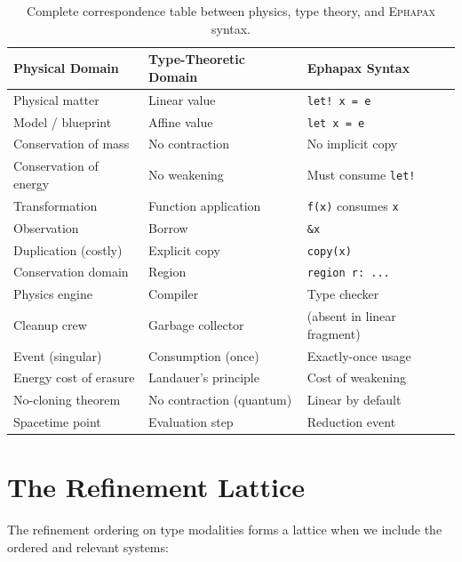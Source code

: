 \documentclass[11pt,a4paper]{article}
\newcommand{\ephapax}{\textsc{Ephapax}}
\begin{document}
\begin{table}[ht]
\centering
\small
\begin{tabular}{@{}lll@{}}
\toprule
\textbf{Physical Domain} & \textbf{Type-Theoretic Domain} & \textbf{Ephapax Syntax} \\
\midrule
Physical matter & Linear value & \texttt{let! x = e} \\
Model / blueprint & Affine value & \texttt{let x = e} \\
Conservation of mass & No contraction & No implicit copy \\
Conservation of energy & No weakening & Must consume \texttt{let!} \\
Transformation & Function application & \texttt{f(x)} consumes \texttt{x} \\
Observation & Borrow & \texttt{\&x} \\
Duplication (costly) & Explicit copy & \texttt{copy(x)} \\
Conservation domain & Region & \texttt{region r: ...} \\
Physics engine & Compiler & Type checker \\
Cleanup crew & Garbage collector & (absent in linear fragment) \\
Event (singular) & Consumption (once) & Exactly-once usage \\
Energy cost of erasure & Landauer's principle & Cost of weakening \\
No-cloning theorem & No contraction (quantum) & Linear by default \\
Spacetime point & Evaluation step & Reduction event \\
\bottomrule
\end{tabular}
\caption{Complete correspondence table between physics, type theory,
  and \ephapax{} syntax.}
\label{tab:full-correspondence}
\end{table}

\section{The Refinement Lattice}
\label{app:lattice}

The refinement ordering on type modalities forms a lattice when we
include the ordered and relevant systems:
\end{document}
